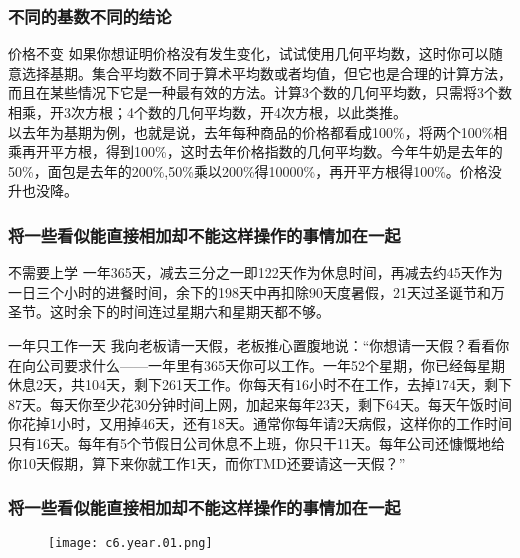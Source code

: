 \begin{frame}
  \frametitle{不同的基数不同的结论}
  \begin{block}{价格不变}
    如果你想证明价格没有发生变化，试试使用几何平均数，这时你可以随意选择基期。集合平均数不同于算术平均数或者均值，但它也是合理的计算方法，而且在某些情况下它是一种最有效的方法。计算3个数的几何平均数，只需将3个数相乘，开3次方根；4个数的几何平均数，开4次方根，以此类推。\\
    \vspace{0.5em}
  以去年为基期为例，也就是说，去年每种商品的价格都看成100\%，将两个100\%相乘再开平方根，得到100\%，这时去年价格指数的几何平均数。今年牛奶是去年的50\%，面包是去年的200\%,50\%乘以200\%得10000\%，再开平方根得100\%。价格没升也没降。
  \end{block}
\end{frame}

\begin{frame}
  \frametitle{将一些看似能直接相加却不能这样操作的事情加在一起}
  \begin{block}{不需要上学}
一年365天，减去三分之一即122天作为休息时间，再减去约45天作为一日三个小时的进餐时间，余下的198天中再扣除90天度暑假，21天过圣诞节和万圣节。这时余下的时间连过星期六和星期天都不够。
  \end{block}
  \pause
  \begin{block}{一年只工作一天}
    我向老板请一天假，老板推心置腹地说：“你想请一天假？看看你在向公司要求什么——一年里有365天你可以工作。一年52个星期，你已经每星期休息2天，共104天，剩下261天工作。你每天有16小时不在工作，去掉174天，剩下87天。每天你至少花30分钟时间上网，加起来每年23天，剩下64天。每天午饭时间你花掉1小时，又用掉46天，还有18天。通常你每年请2天病假，这样你的工作时间只有16天。每年有5个节假日公司休息不上班，你只干11天。每年公司还慷慨地给你10天假期，算下来你就工作1天，而你TMD还要请这一天假？”
  \end{block}
\end{frame}

\begin{frame}
  \frametitle{将一些看似能直接相加却不能这样操作的事情加在一起}
  \begin{figure}
    \centering
    \texttt{[image: c6.year.01.png]}
  \end{figure}
\end{frame}

